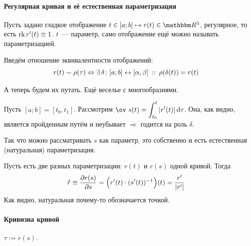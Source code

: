 \documentclass[draft,timbord]{longnotes}
\begin{document}
\paragraph{Регулярная кривая и её естественная параметризация}
\label{par:dg::curve}

\begin{defn}\label{defn:dg::curve::map}
  Пусть задано гладкое отображение $t\in [a;b] \mapsto r(t) \in \R^3$, регулярное, то есть
  $\operatorname{rk} r'(t) \equiv 1$. $t$~--- параметр, само отображение ещё можно
  называть параметризацией.

\end{defn}

\begin{defn}\label{defn:dg::curve::class}
  Введём отношение эквивалентности отображений:
  \[
    r(t) \sim \rho(\tau) \Leftrightarrow 
    \exists\, \delta \colon [a;b] \leftrightarrow [\alpha, \beta ] \:::\: \rho (\delta (t)) = r(t)
  \]
\end{defn}

А теперь будем их путать. \flame
Ещё веселье с многообразиями.

\begin{defn}\label{defn:dg::curve::nat}
  Пусть $[a;b] = [t_0, t_1]$.
  Рассмотрим $\ov~s(t) = \dint_{t_0}^t | r'(t) | \, \del \tau $. Она, как видно, является 
  пройденным путём и неубывает  $ \Rightarrow $ годится на роль $\delta$.

  Так что можно рассматривать $s$ как параметр,  это собственно и есть
  естественная (натуральная) параметризация.
\end{defn}


\begin{prop}\label{prop:dg::curve::repar}
  Пусть есть две разных параметризации: $r(t)$ и $r(s)$ одной кривой. Тогда 
  \[
    \accentset{\mbox{\bfseries .}}{r} \equiv \frac{\partial r(s)}{\partial s} = \Bigl(r'(t) \cdot (s'(t))^{-1}\Bigr)(t) = \frac{r'}{|r'|} 
  \]
  Как видно, натуральная почему-то обозначается точкой.
\end{prop}

\paragraph{Кривизна кривой}
\label{par:dg::curvature}

\begin{defn}\label{defn:dg::curvature::tang}
  $\tau := \dot r(s)$.
\end{defn}
\end{document}
